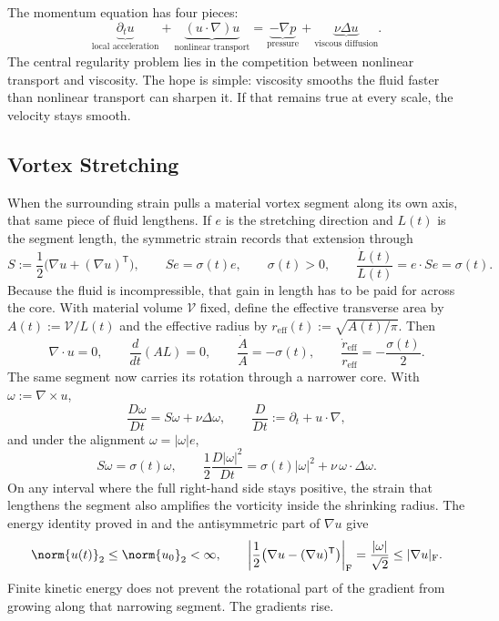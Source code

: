 
The momentum equation has four pieces:
\[
  \underbrace{\partial_t u}_{\text{local acceleration}}
  +
  \underbrace{(u\cdot\nabla)u}_{\text{nonlinear transport}}
  =
  \underbrace{-\nabla p}_{\text{pressure}}
  +
  \underbrace{\nu\Delta u}_{\text{viscous diffusion}}.
\]
The central regularity problem lies in the competition between nonlinear transport and viscosity.
The hope is simple: viscosity smooths the fluid faster than nonlinear transport can sharpen it.
If that remains true at every scale, the velocity stays smooth.

\subsection{Vortex Stretching}\label{sub:ThePerfectlyStretchingVortex}

When the surrounding strain pulls a material vortex segment along its own axis, that same piece of fluid lengthens. If \(e\) is the stretching direction and \(L(t)\) is the segment length, the symmetric strain records that extension through
\[
  S:=\frac12\bigl(\nabla u+(\nabla u)^{\mathsf T}\bigr),
  \qquad
  Se=\sigma(t)e,
  \qquad
  \sigma(t)>0,
  \qquad
  \frac{\dot L(t)}{L(t)}
  =
  e\cdot Se
  =
  \sigma(t).
\]
Because the fluid is incompressible, that gain in length has to be paid for across the core. With material volume \(\mathcal V\) fixed, define the effective transverse area by \(A(t):=\mathcal V/L(t)\) and the effective radius by \(r_{\mathrm{eff}}(t):=\sqrt{A(t)/\pi}\). Then
\[
  \nabla\cdot u=0,
  \qquad
  \frac{d}{dt}(A L)=0,
  \qquad
  \frac{\dot A}{A}=-\sigma(t),
  \qquad
  \frac{\dot r_{\mathrm{eff}}}{r_{\mathrm{eff}}}
  =
  -\frac{\sigma(t)}{2}.
\]
The same segment now carries its rotation through a narrower core. With \(\omega:=\nabla\times u\),
\[
  \frac{D\omega}{Dt}
  =
  S\omega+\nu\Delta\omega,
  \qquad
  \frac{D}{Dt}
  :=
  \partial_t+u\cdot\nabla,
\]
and under the alignment \(\omega=|\omega|e\),
\[
  S\omega
  =
  \sigma(t)\omega,
  \qquad
  \frac12\frac{D|\omega|^2}{Dt}
  =
  \sigma(t)|\omega|^2
  +
  \nu\,\omega\cdot\Delta\omega.
\]
On any interval where the full right-hand side stays positive, the strain that lengthens the segment also amplifies the vorticity inside the shrinking radius. The energy identity proved in  and the antisymmetric part of \(\nabla u\) give
\[
  \norm{u(t)}_2
  \leq
  \norm{u_0}_2
  <\infty,
  \qquad
  \left|\frac12\bigl(\nabla u-(\nabla u)^{\mathsf T}\bigr)\right|_{\mathrm F}
  =
  \frac{|\omega|}{\sqrt2}
  \leq
  |\nabla u|_{\mathrm F}.
\]
Finite kinetic energy does not prevent the rotational part of the gradient from growing along that narrowing segment. The gradients rise.

